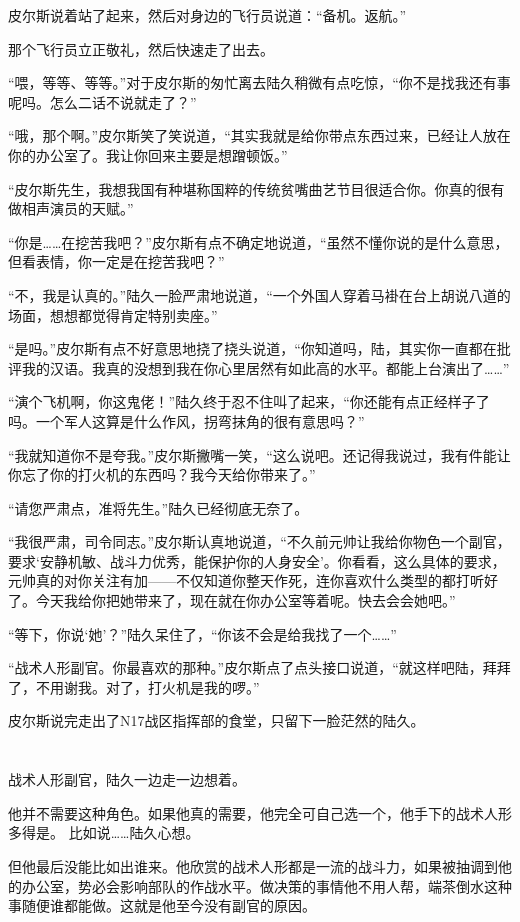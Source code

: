 皮尔斯说着站了起来，然后对身边的飞行员说道：“备机。返航。”

那个飞行员立正敬礼，然后快速走了出去。

“喂，等等、等等。”对于皮尔斯的匆忙离去陆久稍微有点吃惊，“你不是找我还有事呢吗。怎么二话不说就走了？”

“哦，那个啊。”皮尔斯笑了笑说道，“其实我就是给你带点东西过来，已经让人放在你的办公室了。我让你回来主要是想蹭顿饭。”

“皮尔斯先生，我想我国有种堪称国粹的传统贫嘴曲艺节目很适合你。你真的很有做相声演员的天赋。”

“你是……在挖苦我吧？”皮尔斯有点不确定地说道，“虽然不懂你说的是什么意思，但看表情，你一定是在挖苦我吧？”

“不，我是认真的。”陆久一脸严肃地说道，“一个外国人穿着马褂在台上胡说八道的场面，想想都觉得肯定特别卖座。”

“是吗。”皮尔斯有点不好意思地挠了挠头说道，“你知道吗，陆，其实你一直都在批评我的汉语。我真的没想到我在你心里居然有如此高的水平。都能上台演出了……”

“演个飞机啊，你这鬼佬！”陆久终于忍不住叫了起来，“你还能有点正经样子了吗。一个军人这算是什么作风，拐弯抹角的很有意思吗？”

“我就知道你不是夸我。”皮尔斯撇嘴一笑，“这么说吧。还记得我说过，我有件能让你忘了你的打火机的东西吗？我今天给你带来了。”

“请您严肃点，准将先生。”陆久已经彻底无奈了。

“我很严肃，司令同志。”皮尔斯认真地说道，“不久前元帅让我给你物色一个副官，要求‘安静机敏、战斗力优秀，能保护你的人身安全’。你看看，这么具体的要求，元帅真的对你关注有加——不仅知道你整天作死，连你喜欢什么类型的都打听好了。今天我给你把她带来了，现在就在你办公室等着呢。快去会会她吧。”

“等下，你说‘她’？”陆久呆住了，“你该不会是给我找了一个……”

“战术人形副官。你最喜欢的那种。”皮尔斯点了点头接口说道，“就这样吧陆，拜拜了，不用谢我。对了，打火机是我的啰。”

皮尔斯说完走出了N17战区指挥部的食堂，只留下一脸茫然的陆久。
\section*{}

战术人形副官，陆久一边走一边想着。

他并不需要这种角色。如果他真的需要，他完全可自己选一个，他手下的战术人形多得是。
比如说……陆久心想。

但他最后没能比如出谁来。他欣赏的战术人形都是一流的战斗力，如果被抽调到他的办公室，势必会影响部队的作战水平。做决策的事情他不用人帮，端茶倒水这种事随便谁都能做。这就是他至今没有副官的原因。

